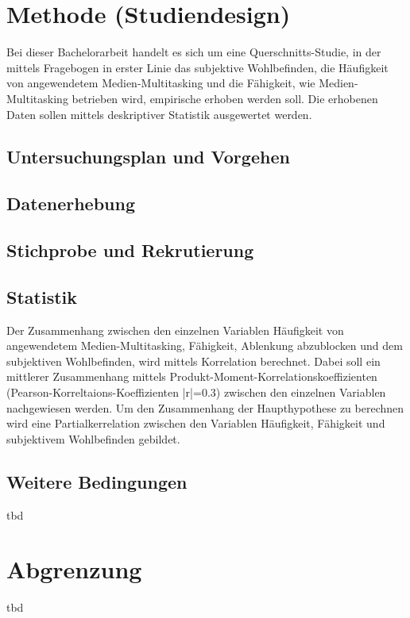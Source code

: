 \section*{Methode (Studiendesign)}\label{section.methode}
Bei dieser Bachelorarbeit handelt es sich um eine Querschnitts-Studie, in der mittels Fragebogen in erster Linie das subjektive Wohlbefinden, die Häufigkeit von angewendetem Medien-Multitasking und die Fähigkeit, wie Medien-Multitasking betrieben wird, empirische erhoben werden soll. Die erhobenen Daten sollen mittels deskriptiver Statistik ausgewertet werden. \\
\subsection*{Untersuchungsplan und Vorgehen}

\subsection*{Datenerhebung}
\subsection*{Stichprobe und Rekrutierung}
\subsection*{Statistik}
Der Zusammenhang zwischen den einzelnen Variablen Häufigkeit von angewendetem Medien-Multitasking, Fähigkeit, Ablenkung abzublocken und dem subjektiven Wohlbefinden, wird mittels Korrelation berechnet. Dabei soll ein mittlerer Zusammenhang mittels Produkt-Moment-Korrelationskoeffizienten (Pearson-Korreltaions-Koeffizienten |r|=0.3) zwischen den einzelnen Variablen nachgewiesen werden. Um den Zusammenhang der Haupthypothese zu berechnen wird eine Partialkerrelation zwischen den Variablen Häufigkeit, Fähigkeit und subjektivem Wohlbefinden gebildet.\\

\subsection*{Weitere Bedingungen}
tbd
\section*{Abgrenzung}\label{section.abgrenzung}
tbd
